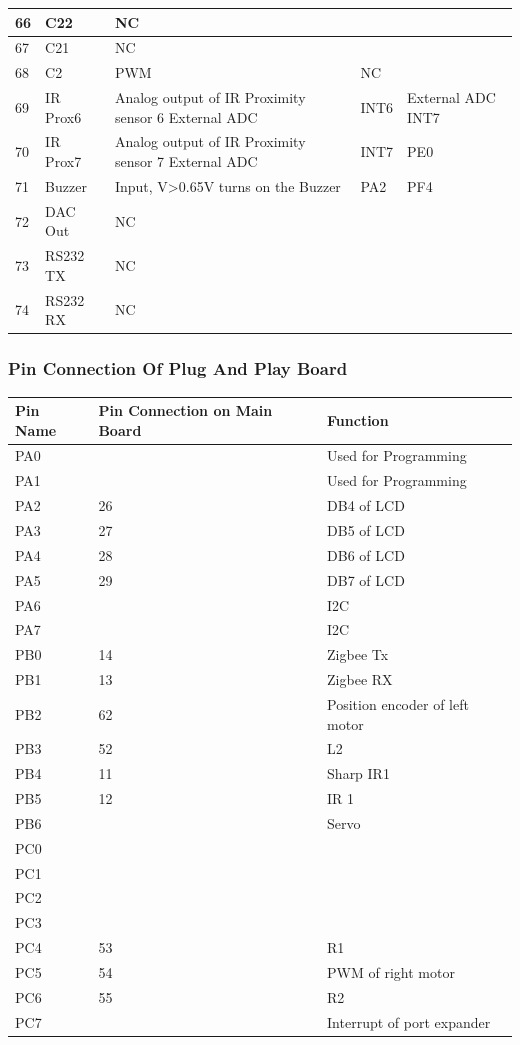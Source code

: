 \documentclass[a4paper,10pt,oneside]{article}
\begin{document}
{\begin{longtable}{|p{}|p{}|p{}|p{}|p{}|}
				66&	C22&	NC& &	\\ \hline
				67&	C21	& NC& &	\\ \hline
				68&	C2&PWM&	NC &	\\ \hline
				69&	IR Prox6&	Analog output of IR Proximity sensor 6	External ADC &INT6 &	External ADC INT7\\ \hline
				70&	IR Prox7&	Analog output of IR Proximity sensor 7	External ADC &INT7 & PE0\\ \hline
				71&	Buzzer&	Input, V>0.65V turns on the Buzzer&	PA2 & PF4\\ \hline
				72&	DAC Out&	NC& &	\\ \hline
				73&	RS232 TX&	NC& &	\\ \hline
				74&	RS232 RX&	NC& &	\\ \hline

		\end{longtable}
\newpage
	\subsubsection{\textbf{Pin Connection Of Plug And Play Board}}
		\begin{longtable}{|p{}|p{}|p{}|}\hline
			Pin Name&	Pin Connection on Main Board&	Function \\ \hline
			PA0&&	Used for Programming\\ \hline
			PA1&&	Used for Programming\\ \hline
			PA2&	26&	DB4 of LCD\\ \hline
			PA3&	27&	DB5 of LCD\\ \hline
			PA4&	28&	DB6 of LCD\\ \hline
			PA5&	29&	DB7 of LCD\\ \hline
			PA6&	&I2C\\ \hline
			PA7&	&I2C\\ \hline
			
			PB0&	14&	Zigbee Tx\\ \hline
			PB1&	13&	Zigbee RX\\ \hline
			PB2&	62&	Position encoder of left motor\\ \hline
			PB3&	52&	L2\\ \hline
			PB4&	11&	Sharp IR1\\ \hline
			PB5&	12&	IR 1\\ \hline
			PB6&	&	Servo\\ \hline
			PC0	&	&\\ \hline
			PC1&	&	\\ \hline
			PC2&	&	\\ \hline
			PC3&	&	\\ \hline
			PC4&	53&	R1\\ \hline
			PC5&	54&	PWM of right motor\\ \hline
			PC6&	55&	R2\\ \hline
			PC7&	&	Interrupt of port expander\\ \hline
			

\end{longtable}}
\end{document}
